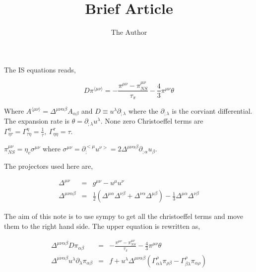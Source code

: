 \documentclass[11pt, oneside]{article}   	%
\title{Brief Article}
\author{The Author}
\begin{document}
\maketitle
The IS equations reads,

\begin{equation}
D\pi^{\langle \mu \nu \rangle} = - \frac{\pi^{\mu\nu} - \pi_{NS}^{\mu\nu}}{\tau_{\pi}} - \frac{4}{3}\pi^{\mu\nu}\theta \end{equation}


Where $A^{\langle \mu \nu \rangle} = \Delta^{\mu\nu\alpha\beta} A_{\alpha \beta}$ and $D \equiv u^{\lambda} \partial_{;\lambda}$ where the $\partial_{;\lambda}$ is the corviant differential. The expansion rate is $\theta=\partial_{;\lambda}u^{\lambda}$. None zero Christoeffel terms are $\Gamma^{\eta}_{\eta\tau}= \Gamma^{\eta}_{\tau\eta}= \frac{1}{\tau},\ \Gamma^{\tau}_{\eta\eta}=\tau$.

$\pi_{NS}^{\mu\nu} = \eta_v \sigma^{\mu\nu}$ where $\sigma^{\mu\nu} = \partial_{;}^{<\mu}u^{\nu>} = 2 \Delta^{\mu\nu\alpha\beta}\partial_{;\alpha}u_{\beta} $.

The projectors used here are,

\begin{eqnarray}
\Delta^{\mu\nu} &=& g^{\mu\nu} - u^{\mu} u^{\nu} \\
\Delta^{\mu\nu\alpha\beta} &=& \frac{1}{2}(\Delta^{\mu\alpha} \Delta^{\nu\beta} + \Delta^{\nu\alpha} \Delta^{\mu\beta}) - \frac{1}{3}\Delta^{\mu\alpha} \Delta^{\nu\beta}
\end{eqnarray}


The aim of this note is to use sympy to get all the christoeffel terms and move them to the right hand side.
The upper equation is rewritten as,


\begin{eqnarray}
\Delta^{\mu\nu\alpha\beta} D \pi_{\alpha \beta} &=& - \frac{\pi^{\mu\nu} - \pi_{NS}^{\mu\nu}}{\tau_{\pi}} - \frac{4}{3}\pi^{\mu\nu}\theta\\
\Delta^{\mu\nu\alpha\beta} u^{\lambda}\partial_{\lambda}\pi_{\alpha \beta} &=& f + u^{\lambda}\Delta^{\mu\nu\alpha\beta}(\Gamma^{\rho}_{\alpha\lambda}\pi_{\rho\beta} - \Gamma^{\rho}_{\beta\lambda}\pi_{\alpha\rho})
\end{eqnarray}
\end{document}
